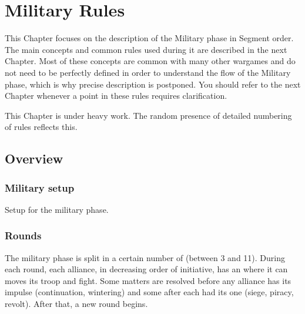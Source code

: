 
\newcommand{\iamhere}{\begin{todo} The following is copy of older stuff and de
    facto cease to be relevant before I reread and rewrite it.
\end{todo}}

\chapter{Military Rules}\label{chapter:MilitaryRules}

\begin{designnote}
  This Chapter focuses on the description of the Military phase in Segment
  order. The main concepts and common rules used during it are described in
  the next Chapter. Most of these concepts are common with many other wargames
  and do not need to be perfectly defined in order to understand the flow of
  the Military phase, which is why precise description is postponed. You
  should refer to the next Chapter whenever a point in these rules requires
  clarification.
\end{designnote}

\begin{todo}
  This Chapter is under heavy work. The random presence of detailed numbering
  of rules reflects this.
\end{todo}

\section{Overview}
\aparag[Sequence]
\MilitaryDetails

\subsection{Military setup}
Setup for the military phase.

\subsection{Rounds}
The military phase is split in a certain number of  (between 3
and 11). During each round, each alliance, in decreasing order of initiative,
has an  where it can moves its troop and fight. Some matters
are resolved before any alliance has its impulse (continuation, wintering) and
some after each had its one (siege, piracy, revolt). After that, a new round
begins.
